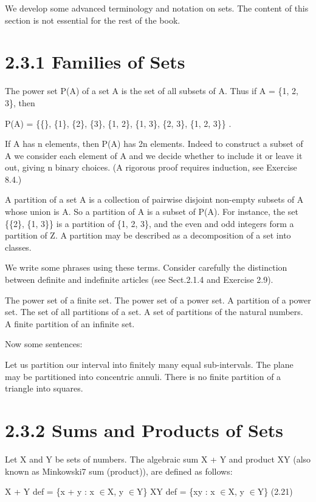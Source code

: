 \documentclass[11pt]{article}
\theoremstyle{plain}
\theoremstyle{definition}
\begin{document}
We develop some advanced terminology and notation on sets. The content of this section is not essential for the rest of the book.

\section{2.3.1 Families of Sets}

The power set P(A) of a set A is the set of all subsets of A. Thus if A = \{1, 2, 3\}, then

P(A) = \{\{\}, \{1\}, \{2\}, \{3\}, \{1, 2\}, \{1, 3\}, \{2, 3\}, \{1, 2, 3\}\} .

If A has n elements, then P(A) has 2n elements. Indeed to construct a subset of A we consider each element of A and we decide whether to include it or leave it out, giving n binary choices. (A rigorous proof requires induction, see Exercise 8.4.)

A partition of a set A is a collection of pairwise disjoint non-empty subsets of A whose union is A. So a partition of A is a subset of P(A). For instance, the set \{\{2\}, \{1, 3\}\} is a partition of \{1, 2, 3\}, and the even and odd integers form a partition of Z. A partition may be described as a decomposition of a set into classes.

We write some phrases using these terms. Consider carefully the distinction between definite and indefinite articles (see Sect.2.1.4 and Exercise 2.9).

The power set of a finite set. The power set of a power set. A partition of a power set. The set of all partitions of a set. A set of partitions of the natural numbers. A finite partition of an infinite set.

Now some sentences:

Let us partition our interval into finitely many equal sub-intervals. The plane may be partitioned into concentric annuli. There is no finite partition of a triangle into squares.

\section{2.3.2 Sums and Products of Sets}

Let X and Y be sets of numbers. The algebraic sum X + Y and product XY (also known as Minkowski7 sum (product)), are defined as follows:

X + Y def = \{x + y : x $\in$X, y $\in$Y\} XY def = \{xy : x $\in$X, y $\in$Y\} (2.21)
\end{document}
